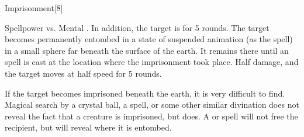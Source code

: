 \begin{spellsection}{Imprisonment}[8]
    \begin{spellheader}
    \end{spellheader}
    \begin{spellcontent}
        \begin{spelltargetinginfo}
        \end{spelltargetinginfo}
        \begin{spelleffects}
            \begin{spellattack}{Spellpower vs. Mental}
                \spellsuccess {}. In addition, the target is \slowed for 5 rounds.
                \spellcritical The target becomes permanently entombed in a state of suspended animation (as the  spell) in a small sphere far beneath the surface of the earth. It remains there until an  spell is cast at the location where the imprisonment took place.
                \spellfailure Half damage, and the target moves at half speed for 5 rounds.
            \end{spellattack}
        \end{spelleffects}
    \end{spellcontent}
    \begin{spellfooter}
        \spellnotes If the target becomes imprisoned beneath the earth, it is very difficult to find. Magical search by a crystal ball, a  spell, or some other similar divination does not reveal the fact that a creature is imprisoned, but  does. A  or  spell will not free the recipient, but will reveal where it is entombed.
        \miscastrandom
    \end{spellfooter}
\end{spellsection}

